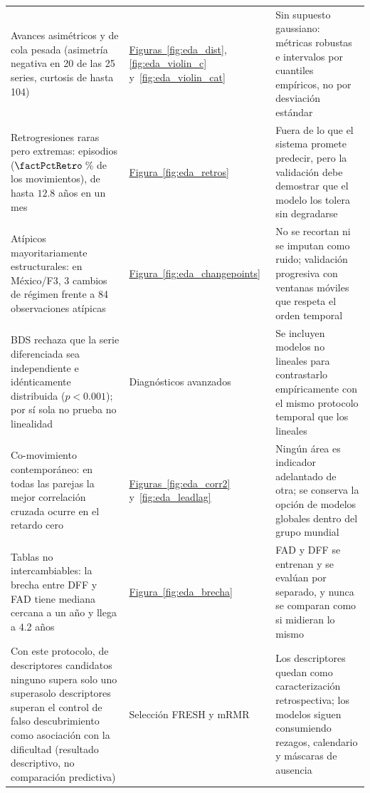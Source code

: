 \documentclass[12pt,letterpaper]{report}
\begin{document}
\begin{table}[htbp]
\begin{tabular}{>{\raggedright\arraybackslash}p{5.4cm}>{\raggedright\arraybackslash}p{2.3cm}>{\raggedright\arraybackslash}p{5.7cm}}
Avances asimétricos y de cola pesada (asimetría negativa en 20 de las 25 series, curtosis de
hasta 104) &
\hyperref[fig:eda_dist]{Figuras~\ref*{fig:eda_dist}}, \ref{fig:eda_violin_c} y~\ref{fig:eda_violin_cat} &
Sin supuesto gaussiano: métricas robustas e intervalos por cuantiles empíricos, no por
desviación estándar \\
Retrogresiones raras pero extremas: \factNRetroEvents{} episodios ($\factPctRetro$\,\% de los
movimientos), de hasta $12.8$ años en un mes &
\hyperref[fig:eda_retros]{Figura~\ref*{fig:eda_retros}} &
Fuera de lo que el sistema promete predecir, pero la validación debe demostrar que el modelo los
tolera sin degradarse \\
Atípicos mayoritariamente estructurales: en México/F3, 3 cambios de régimen frente a 84
observaciones atípicas &
\hyperref[fig:eda_changepoints]{Figura~\ref*{fig:eda_changepoints}} &
No se recortan ni se imputan como ruido; validación progresiva con ventanas móviles que respeta
el orden temporal \\
BDS rechaza que la serie diferenciada sea independiente e idénticamente distribuida
($p<0.001$); por sí sola no prueba no linealidad &
Diagnósticos avanzados &
Se incluyen modelos no lineales para contrastarlo empíricamente con el mismo protocolo temporal
que los lineales \\
Co-movimiento contemporáneo: en todas las parejas la mejor correlación cruzada ocurre en el
retardo cero &
\hyperref[fig:eda_corr2]{Figuras~\ref*{fig:eda_corr2}} y~\ref{fig:eda_leadlag} &
Ningún área es indicador adelantado de otra; se conserva la opción de modelos globales dentro del
grupo mundial \\
Tablas no intercambiables: la brecha entre DFF y FAD tiene mediana cercana a un año y llega a
4.2 años &
\hyperref[fig:eda_brecha]{Figura~\ref*{fig:eda_brecha}} &
FAD y DFF se entrenan y se evalúan por separado, y nunca se comparan como si midieran lo mismo \\
Con este protocolo, de \feFactSelIn{} descriptores candidatos
\ifnum\feFactSelRelevant=0 ninguno supera\else\ifnum\feFactSelRelevant=1 solo uno supera\else solo \feFactSelRelevant{} descriptores superan\fi\fi{}
el control de falso descubrimiento como asociación con la dificultad (resultado
descriptivo, no comparación predictiva) &
Selección FRESH y mRMR &
Los descriptores quedan como caracterización retrospectiva; los modelos siguen
consumiendo rezagos, calendario y máscaras de ausencia \\
\bottomrule
\end{tabular}
\end{table}
\end{document}
